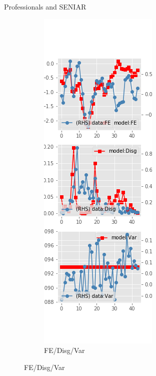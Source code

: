 \documentclass{beamer}
\begin{document}
\begin{frame}{Professionals and SENIAR}
\begin{figure}[ht]
\begin{subfigure}[b]{0.2\textwidth}
		\end{subfigure}
		\hfill
		\begin{subfigure}[b]{0.2\textwidth}
			\caption{FE/Disg/Var}
			\includegraphics[width=\textwidth, height = 0.8\textheight]{figuresDraft/spf_seni_est_diag2.png}
		\end{subfigure}
	\end{figure}
\end{frame}
\end{document}
